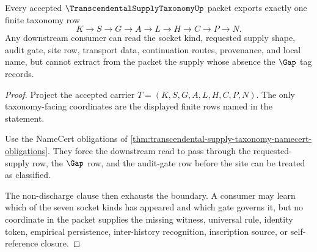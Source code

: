 \begin{theorem}
\label{thm:transcendental-supply-taxonomy-boundary-exhaustion}
Every accepted $\TranscendentalSupplyTaxonomyUp$ packet exports exactly one finite taxonomy row
$$
K \to S \to G \to A \to L \to H \to C \to P \to N.
$$
Any downstream consumer can read the socket kind, requested supply shape, audit gate, site row, transport data, continuation routes, provenance, and local name, but cannot extract from the packet the supply whose absence the $\Gap$ tag records.
\end{theorem}
\begin{proof}
Project the accepted carrier $T=(K,S,G,A,L,H,C,P,N)$. The only taxonomy-facing coordinates are the displayed finite rows named in the statement.

Use the NameCert obligations of \autoref{thm:transcendental-supply-taxonomy-namecert-obligations}. They force the downstream read to pass through the requested-supply row, the $\Gap$ row, and the audit-gate row before the site can be treated as classified.

The non-discharge clause then exhausts the boundary. A consumer may learn which of the seven socket kinds has appeared and which gate governs it, but no coordinate in the packet supplies the missing witness, universal rule, identity token, empirical persistence, inter-history recognition, inscription source, or self-reference closure.
\end{proof}

